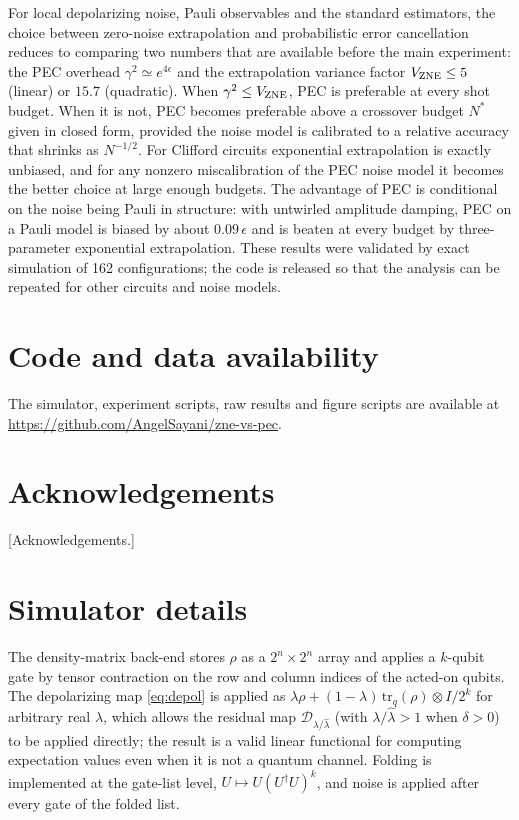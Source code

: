 \documentclass[11pt,a4paper]{article}
\theoremstyle{remark}
\newcommand{\tr}{\mathrm{tr}}
\newcommand{\eps}{\epsilon}
\begin{document}
For local depolarizing noise, Pauli observables and the standard estimators, the choice between zero-noise extrapolation and probabilistic error cancellation reduces to comparing two numbers that are available before the main experiment: the PEC overhead $\gamma^2\simeq e^{4\eps}$ and the extrapolation variance factor $V_{\rm ZNE}\le5$ (linear) or $15.7$ (quadratic). When $\gamma^2\le V_{\rm ZNE}$, PEC is preferable at every shot budget. When it is not, PEC becomes preferable above a crossover budget $N^*$ given in closed form, provided the noise model is calibrated to a relative accuracy that shrinks as $N^{-1/2}$. For Clifford circuits exponential extrapolation is exactly unbiased, and for any nonzero miscalibration of the PEC noise model it becomes the better choice at large enough budgets. The advantage of PEC is conditional on the noise being Pauli in structure: with untwirled amplitude damping, PEC on a Pauli model is biased by about $0.09\,\eps$ and is beaten at every budget by three-parameter exponential extrapolation. These results were validated by exact simulation of 162 configurations; the code is released so that the analysis can be repeated for other circuits and noise models.

\section*{Code and data availability}
The simulator, experiment scripts, raw results and figure scripts are available at \url{https://github.com/AngelSayani/zne-vs-pec}.

\section*{Acknowledgements}
[Acknowledgements.]

\appendix
\section{Simulator details}
\label{app:sim}
The density-matrix back-end stores $\rho$ as a $2^n\times2^n$ array and applies a $k$-qubit gate by tensor contraction on the row and column indices of the acted-on qubits. The depolarizing map \cref{eq:depol} is applied as $\lambda\rho+(1-\lambda)\,\tr_q(\rho)\otimes I/2^k$ for arbitrary real $\lambda$, which allows the residual map $\mathcal D_{\lambda/\hat\lambda}$ (with $\lambda/\hat\lambda>1$ when $\delta>0$) to be applied directly; the result is a valid linear functional for computing expectation values even when it is not a quantum channel. Folding is implemented at the gate-list level, $U\mapsto U(U^\dagger U)^k$, and noise is applied after every gate of the folded list.
\end{document}
